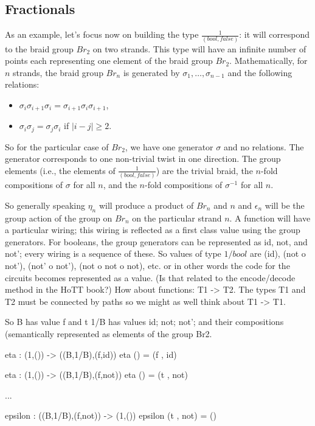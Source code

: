 \documentclass[11pt]{article}
\newcommand{\br}{\mathit{Br}}
\newcommand{\boolt}{\mathit{bool}}
\newcommand{\ffv}{\mathit{false}}
\begin{document}
\subsection{Fractionals} 

As an example, let's focus now on building the type
$\frac{1}{(\boolt,\ffv)}$: it will correspond to the braid group $\br_2$ on
two strands. This type will have an infinite number of points each
representing one element of the braid group $\br_2$. Mathematically, for $n$
strands, the braid group $\br_n$ is generated by $\sigma_1, \ldots,
\sigma_{n-1}$ and the following relations:
\begin{itemize}
\item $\sigma_i\sigma_{i+1}\sigma_i = \sigma_{i+1}\sigma_{i}\sigma_{i+1}$, 
\item $\sigma_i\sigma_j = \sigma_j\sigma_i$ if $|i-j| \geq 2$.
\end{itemize}
So for the particular case of $\br_2$, we have one generator $\sigma$ and no
relations. The generator corresponds to one non-trivial twist in one
direction. The group elements (i.e., the elements of
$\frac{1}{(\boolt,\ffv)}$) are the trivial braid, the $n$-fold compositions
of $\sigma$ for all $n$, and the $n$-fold compositions of $\sigma^{-1}$ for
all $n$. 

So generally speaking $\eta_n$ will produce a product of $\br_n$ and $n$ and
$\epsilon_n$ will be the group action of the group on $\br_n$ on the
particular strand $n$. A function will have a particular wiring; this wiring
is reflected as a first class value using the group generators. For booleans,
the group generators can be represented as id, not, and not'; every wiring is
a sequence of these. So values of type $1/bool$ are (id), (not o not'), (not'
o not'), (not o not o not), etc. or in other words the code for the circuits
becomes represented as a value. (Is that related to the encode/decode method
in the HoTT book?) How about functions: T1 -> T2. The types T1 and T2 must be
connected by paths so we might as well think about T1 -> T1.

So B has value f and t
1/B has values id; not; not'; and their compositions (semantically
represented as elements of the group Br2. 

eta : (1,()) -> ((B,1/B),(f,id))
eta () = (f , id)

eta : (1,()) -> ((B,1/B),(f,not))
eta () = (t , not)

...

epsilon : ((B,1/B),(f,not)) -> (1,())
epsilon (t , not) = ()
\end{document}
